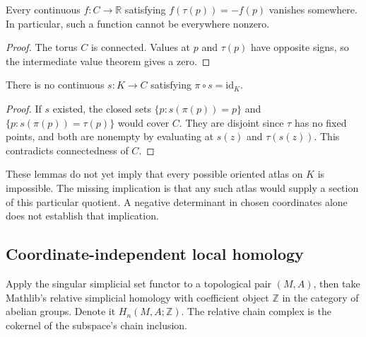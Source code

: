 \begin{lemma}\label{lem:klein-sign-obstruction}

  Every continuous $f:C\to\mathbb R$ satisfying $f(\tau(p))=-f(p)$
  vanishes somewhere. In particular, such a function cannot be everywhere nonzero.
\end{lemma}
\begin{proof}

  The torus $C$ is connected. Values at $p$ and $\tau(p)$ have opposite signs,
  so the intermediate value theorem gives a zero.
\end{proof}

\begin{lemma}\label{lem:klein-no-section}

  There is no continuous $s:K\to C$ satisfying $\pi\circ s=\mathrm{id}_K$.
\end{lemma}
\begin{proof}

  If $s$ existed, the closed sets $\{p:s(\pi(p))=p\}$ and
  $\{p:s(\pi(p))=\tau(p)\}$ would cover $C$. They are disjoint since
  $\tau$ has no fixed points, and both are nonempty by evaluating at $s(z)$
  and $\tau(s(z))$. This contradicts connectedness of $C$.
\end{proof}
These lemmas do not yet imply that every possible oriented atlas on $K$ is
impossible. The missing implication is that any such atlas would supply a
section of this particular quotient. A negative determinant in chosen
coordinates alone does not establish that implication.

\subsection{Coordinate-independent local homology}

\begin{definition}\label{def:relative-homology}

  Apply the singular simplicial set functor to a topological pair $(M,A)$,
  then take Mathlib's relative simplicial homology with coefficient object
  $\mathbb Z$ in the category of abelian groups. Denote it $H_n(M,A;\mathbb Z)$.
  The relative chain complex is the cokernel of the subspace's chain inclusion.
\end{definition}

